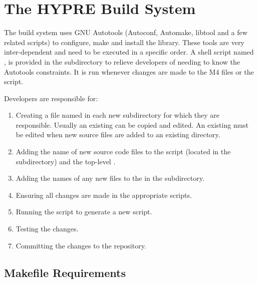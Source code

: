 
\chapter{The HYPRE Build System}
\label{The HYPRE Build System}


The \hypre{} build system uses GNU Autotools (Autoconf, Automake, libtool and a
few related scripts) to configure, make and install the library.  These tools
are very inter-dependent and need to be executed in a specific order. A shell 
script named , is provided in the  subdirectory to
relieve developers of needing to know the Autotools constraints.  It is run 
whenever changes are made to the M4 files or the  script.

Developers are responsible for:
\begin{enumerate}
\item Creating a file named  in each new subdirectory for which 
      they are responsible.  Usually an existing  can be 
      copied and edited. An existing  must be edited when 
      new source files are added to an existing directory.

\item Adding the name of new source code files to the  script 
      (located in the  subdirectory) and the top-level .

\item Adding the names of any new files to the  in the  subdirectory.

\item Ensuring all changes are made in the appropriate scripts.

\item Running the  script to generate a new  script.

\item Testing the changes.

\item Committing the changes to the repository.

\end{enumerate}

\section{Makefile Requirements}
\label{Makefile Requirements}


